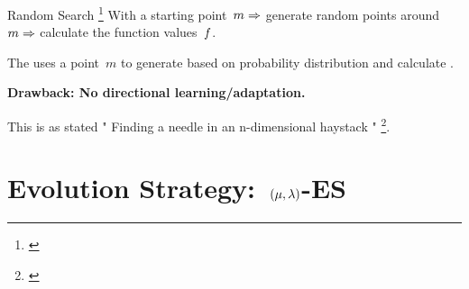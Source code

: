 \documentclass[11pt, aspectratio=169]{beamer}
\begin{document}
\begin{frame}
  
  \vspace{.4cm}
  
  \begin{block}{Random Search \footnote{\cite{573b8afee53b4e0eb2b0ae1cbee23c59}}}
    With a starting point~$m\Rightarrow$ generate random points around~$m \Rightarrow$ calculate the function values~$f$.
  \end{block}

  \begin{block}{}
    The  uses a point~$m$ to generate  based on probability distribution and calculate .
  \end{block}

  \textbf{Drawback: No directional learning/adaptation.}

  This is as stated " Finding a needle in an n-dimensional haystack " \footnote{\cite{korn1966random}}.
\end{frame}

\section{Evolution Strategy:~$(\mu,\lambda)$-ES}

\begin{frame}
\end{frame}
\end{document}
